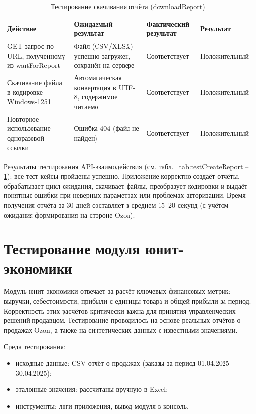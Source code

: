 \begin{table}[!htb]
\caption{\label{tab:testDownloadReport}Тестирование скачивания отчёта (downloadReport)}
\small
\begin{tabular}{|p{4cm}|p{4cm}|p{3cm}|p{4cm}|}
\hline
Действие & Ожидаемый результат & Фактический результат & Результат \\ \hline
GET-запрос по URL, полученному из waitForReport & Файл (CSV/XLSX) успешно загружен, сохранён на сервере & Соответствует & Положительный \\ \hline
Скачивание файла в кодировке Windows-1251 & Автоматическая конвертация в UTF-8, содержимое читаемо & Соответствует & Положительный \\ \hline
Повторное использование одноразовой ссылки & Ошибка 404 (файл не найден) & Соответствует & Положительный \\ \hline
\end{tabular}
\end{table}

Результаты тестирования API-взаимодействия (см. табл.~\ref{tab:testCreateReport}--\ref{tab:testDownloadReport}): все тест-кейсы пройдены успешно. Приложение корректно создаёт отчёты, обрабатывает цикл ожидания, скачивает файлы, преобразует кодировки и выдаёт понятные ошибки при неверных параметрах или проблемах авторизации. Время получения отчёта за 30 дней составляет в среднем 15–20 секунд (с учётом ожидания формирования на стороне Ozon).

\section{Тестирование модуля юнит-экономики}

Модуль юнит-экономики отвечает за расчёт ключевых финансовых метрик: выручки, себестоимости, прибыли с единицы товара и общей прибыли за период. Корректность этих расчётов критически важна для принятия управленческих решений продавцом. Тестирование проводилось на основе реальных отчётов о продажах Ozon, а также на синтетических данных с известными значениями.

Среда тестирования:
\begin{itemize}
\item исходные данные: CSV-отчёт о продажах (заказы за период 01.04.2025 – 30.04.2025);
\item эталонные значения: рассчитаны вручную в Excel;
\item инструменты: логи приложения, вывод модуля в консоль.
\end{itemize}

